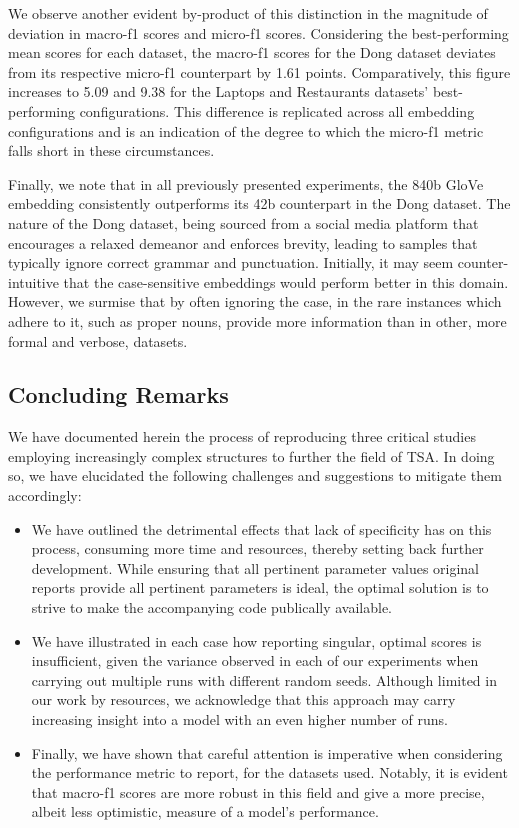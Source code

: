 \documentclass[../../fyp.tex]{subfiles}
\begin{document}
We observe another evident by-product of this distinction in the magnitude of deviation in macro-f1 scores and micro-f1 scores. Considering the best-performing mean scores for each dataset, the macro-f1 scores for the Dong dataset deviates from its respective micro-f1 counterpart by 1.61 points. Comparatively, this figure increases to 5.09 and 9.38 for the Laptops and Restaurants datasets' best-performing configurations. This difference is replicated across all embedding configurations and is an indication of the degree to which the micro-f1 metric falls short in these circumstances.

Finally, we note that in all previously presented experiments, the 840b GloVe embedding consistently outperforms its 42b counterpart in the Dong dataset. The nature of the Dong dataset, being sourced from a social media platform that encourages a relaxed demeanor and enforces brevity, leading to samples that typically ignore correct grammar and punctuation. Initially, it may seem counter-intuitive that the case-sensitive embeddings would perform better in this domain. However, we surmise that by often ignoring the case, in the rare instances which adhere to it, such as proper nouns, provide more information than in other, more formal and verbose, datasets. 

\subsection{Concluding Remarks}
We have documented herein the process of reproducing three critical studies employing increasingly complex structures to further the field of TSA. In doing so, we have elucidated the following challenges and suggestions to mitigate them accordingly: 

\begin{itemize}
	\item We have outlined the detrimental effects that lack of specificity has on this process, consuming more time and resources, thereby setting back further development. While ensuring that all pertinent parameter values original reports provide all pertinent parameters is ideal, the optimal solution is to strive to make the accompanying code publically available. 
	\item We have illustrated in each case how reporting singular, optimal scores is insufficient, given the variance observed in each of our experiments when carrying out multiple runs with different random seeds. Although limited in our work by resources, we acknowledge that this approach may carry increasing insight into a model with an even higher number of runs. 
	\item Finally, we have shown that careful attention is imperative when considering the performance metric to report, for the datasets used. Notably, it is evident that macro-f1 scores are more robust in this field and give a more precise, albeit less optimistic, measure of a model's performance.
\end{itemize}
\end{document}
